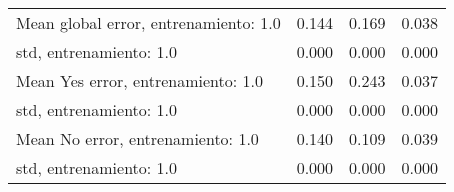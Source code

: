\begin{longtable}{p{4cm}|p{1.5cm}|p{1.5cm}|p{1.5cm}}
Mean global error, entrenamiento: 1.0 &        0.144 &     0.169 &                        0.038 \\
std, entrenamiento: 1.0               &        0.000 &     0.000 &                        0.000 \\
Mean Yes error, entrenamiento: 1.0    &        0.150 &     0.243 &                        0.037 \\
std, entrenamiento: 1.0               &        0.000 &     0.000 &                        0.000 \\
Mean No error, entrenamiento: 1.0     &        0.140 &     0.109 &                        0.039 \\
std, entrenamiento: 1.0               &        0.000 &     0.000 &                        0.000 \\
\end{longtable}
